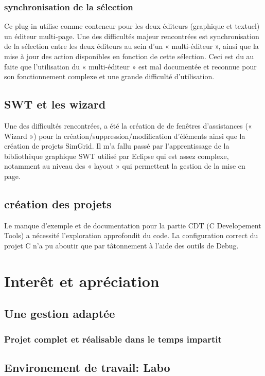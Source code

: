 \documentclass{article}
\begin{document}
    	\subsubsection{synchronisation de la sélection}
    		\label{selection}
    Ce plug-in utilise comme conteneur pour les deux éditeurs (graphique et textuel) un éditeur multi-page. Une des difficultés majeur rencontrées est synchronisation de la sélection entre les deux éditeurs au sein d'un « multi-éditeur », ainsi que la mise à jour des action disponibles en fonction de cette sélection. Ceci est du au faite que l'utilisation du « multi-éditeur » est mal documentée et reconnue pour son fonctionnement complexe et une grande difficulté d'utilisation.
    \subsection{SWT et les wizard}
    Une des difficultés rencontrées, a été la création de de fenêtres d'assistances (« Wizard ») pour la création/suppression/modification d'éléments ainsi que la création de projets SimGrid. Il m'a fallu passé par l'apprentissage de la bibliothèque graphique SWT utilisé par Eclipse qui est assez complexe, notamment au niveau des « layout » qui permettent la gestion de la mise en page.
    \subsection{création des projets}
    	Le manque d'exemple et de documentation pour la partie CDT (C Developement Tools) a nécessité l'exploration approfondit du code. La configuration correct du projet C n'a pu aboutir que par tâtonnement à l'aide des outils de Debug.
        
\section{Interêt et apréciation}
    \subsection{Une gestion adaptée}
    
        \subsubsection{Projet complet et réalisable dans le temps impartit}
    \subsection{Environement de travail: Labo}
\end{document}
